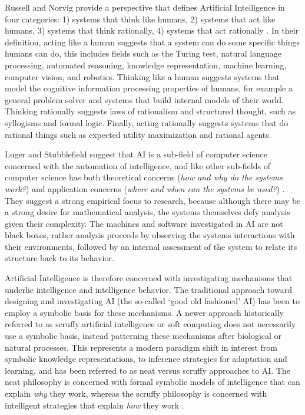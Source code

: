 \begin{bibunit}
Russell and Norvig provide a perspective that defines Artificial Intelligence in four categories: 1) systems that think like humans, 2) systems that act like humans, 3) systems that think rationally, 4) systems that act rationally \cite{Russell2009}. In their definition, acting like a human suggests that a system can do some specific things humans can do, this includes fields such as the Turing test, natural language processing, automated reasoning, knowledge representation, machine learning, computer vision, and robotics. Thinking like a human suggests systems that model the cognitive information processing properties of humans, for example a general problem solver and systems that build internal models of their world. Thinking rationally suggests laws of rationalism and structured thought, such as syllogisms and formal logic. Finally, acting rationally suggests systems that do rational things such as expected utility maximization and rational agents. 

Luger and Stubblefield suggest that AI is a sub-field of computer science concerned with the automation of intelligence, and like other sub-fields of computer science has both theoretical concerns (\emph{how and why do the systems work?}) and application concerns (\emph{where and when can the systems be used?}) \cite{Luger1993}. They suggest a strong empirical focus to research, because although there may be a strong desire for mathematical analysis, the systems themselves defy analysis given their complexity. The machines and software investigated in AI are not black boxes, rather analysis proceeds by observing the systems interactions with their environments, followed by an internal assessment of the system to relate its structure back to its behavior.

Artificial Intelligence is therefore concerned with investigating mechanisms that underlie intelligence and intelligence behavior. The traditional approach toward designing and investigating AI (the so-called `good old fashioned' AI) has been to employ a symbolic basis for these mechanisms. A newer approach historically referred to as scruffy artificial intelligence or soft computing does not necessarily use a symbolic basis, instead patterning these mechanisms after biological or natural processes. This represents a modern paradigm shift in interest from symbolic knowledge representations, to inference strategies for adaptation and learning, and has been referred to as neat versus scruffy approaches to AI. The neat philosophy is concerned with formal symbolic models of intelligence that can explain \emph{why} they work, whereas the scruffy philosophy is concerned with intelligent strategies that explain \emph{how} they work \cite{Sloman1990}.


\end{bibunit}
